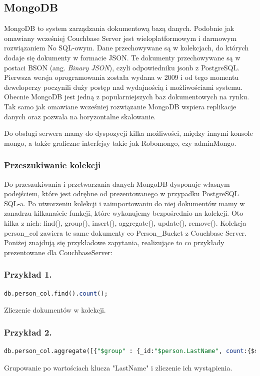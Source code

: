 \documentclass[a4paper,12pt,table]{article}
\begin{document}
{\subsection{MongoDB}
MongoDB to system zarządzania dokumentową bazą danych. Podobnie jak omawiany wcześniej Couchbase Server jest wieloplatformowym i darmowym rozwiązaniem No SQL-owym. Dane przechowywane są w kolekcjach, do których dodaje się dokumenty w formacie JSON. Te dokumenty przechowywane są w postaci BSON (ang. \textit{ Binary JSON}), czyli odpowiedniku jsonb z PostgreSQL. Pierwsza wersja oprogramowania została wydana w 2009 i od tego momentu deweloperzy poczynili duży postęp nad wydajnością i możliwościami systemu.\cite{mdb} Obecnie MongoDB jest jedną z popularniejszych baz dokumentowych na rynku. Tak samo jak omawiane wcześniej rozwiązanie MongoDB wspiera replikacje danych oraz pozwala na horyzontalne skalowanie.

Do obsługi serwera mamy do dyspozycji kilka możliwości, między innymi konsole mongo, a także graficzne interfejsy takie jak Robomongo, czy adminMongo.
\subsubsection{Przeszukiwanie kolekcji}
Do przeszukiwania i przetwarzania danych MongoDB dysponuje własnym podejściem, które jest odrębne od prezentowanego w przypadku PostgreSQL SQL-a. Po utworzeniu kolekcji i zaimportowaniu do niej dokumentów mamy w zanadrzu kilkanaście funkcji, które wykonujemy bezpośrednio na kolekcji. Oto kilka z nich: find(), group(), insert(), aggregate(), update(), remove(). Kolekcja person\_col zawiera te same dokumenty co Person\_Bucket z Couchbase Server. Poniżej znajdują się przykładowe zapytania, realizujące to co przykłady prezentowane dla CouchbaseServer:
\subsubsection*{Przykład 1.}
\begin{lstlisting}[language=SQL,basicstyle=\footnotesize]
db.person_col.find().count();
\end{lstlisting}
\vspace{0.5cm}
Zliczenie dokumentów w kolekcji.
\subsubsection*{Przykład 2.}
\begin{lstlisting}[language=SQL,basicstyle=\footnotesize]
db.person_col.aggregate([{"$group" : {_id:"$person.LastName", count:{$sum:1}}}])
\end{lstlisting}
\vspace{0.5cm}
Grupowanie po wartościach klucza "LastName" i zliczenie ich wystąpienia.
\newpage
}
\end{document}
